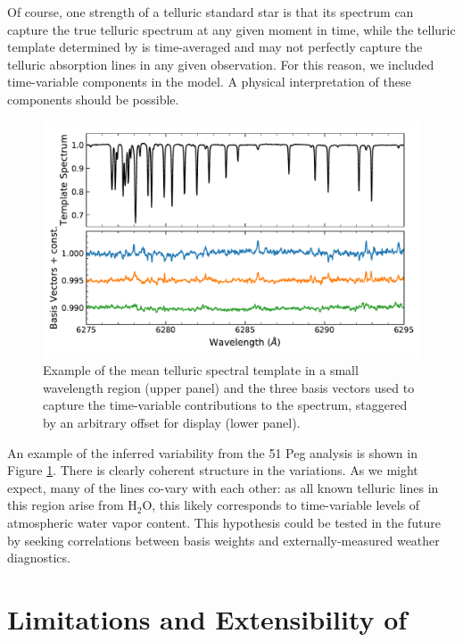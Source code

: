 \documentclass[twocolumn]{aastex62}
\begin{document}
Of course, one strength of a telluric standard star is that its spectrum can capture the true telluric spectrum at any given moment in time, while the telluric template determined by \wobble is time-averaged and may not perfectly capture the telluric absorption lines in any given observation. 
For this reason, we included time-variable components in the model. 
A physical interpretation of these components should be possible.

\begin{figure}
\centering
\includegraphics[width=5in]{telluric_basis}
\caption{Example of the mean telluric spectral template in a small wavelength region (upper panel) and the three basis vectors used to capture the time-variable contributions to the spectrum, staggered by an arbitrary offset for display (lower panel).}
\label{fig:telluric_basis}
\end{figure}

An example of the inferred variability from the 51 Peg analysis is shown in Figure \ref{fig:telluric_basis}. 
There is clearly coherent structure in the variations. 
As we might expect, many of the lines co-vary with each other: as all known telluric lines in this region arise from H$_2$O, this likely corresponds to time-variable levels of atmospheric water vapor content. 
This hypothesis could be tested in the future by seeking correlations between basis weights and externally-measured weather diagnostics. 


\section{Limitations and Extensibility of \wobble}
\label{s:future}
\end{document}
